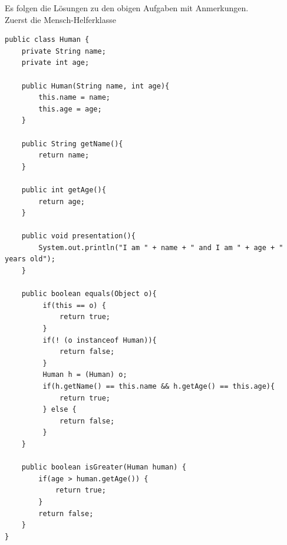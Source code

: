 \documentclass{article}
\begin{document}
Es folgen die Lösungen zu den obigen Aufgaben mit Anmerkungen. \\
Zuerst die Mensch-Helferklasse
\begin{verbatim}
public class Human {
    private String name;
    private int age; 

    public Human(String name, int age){
        this.name = name;
        this.age = age;
    }

    public String getName(){
        return name;
    }

    public int getAge(){
        return age;
    }

    public void presentation(){
        System.out.println("I am " + name + " and I am " + age + " years old");
    }

    public boolean equals(Object o){
         if(this == o) {
             return true;
         }
         if(! (o instanceof Human)){
             return false;
         } 
         Human h = (Human) o;
         if(h.getName() == this.name && h.getAge() == this.age){
             return true;
         } else {
             return false;
         }
    }

    public boolean isGreater(Human human) {
        if(age > human.getAge()) {
            return true;
        }
        return false; 
    }
}
\end{verbatim}
\end{document}
